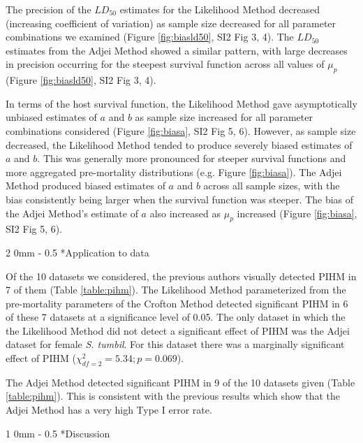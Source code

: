 \documentclass[12pt, a4paper]{article}
\makeatletter
\renewcommand{\section}{\@startsection
{section}%
{1}%
{0mm}%
{-\baselineskip}%
{0.5\baselineskip}%
{\normalfont\bf\large}} %
\renewcommand{\subsection}{\@startsection
{subsection}%
{2}%
{0mm}%
{-\baselineskip}%
{0.5\baselineskip}%
{\normalfont\bf}} %
\makeatother
\begin{document}
The precision of the $LD_{50}$ estimates for the Likelihood Method decreased
(increasing coefficient of variation) as sample size decreased for all
parameter combinations we examined (Figure \ref{fig:biasld50}, SI2 Fig 3, 4).  The $LD_{50}$ estimates from the Adjei
Method showed a similar pattern, with large decreases in precision occurring
for the steepest survival function across all values of $\mu_p$ (Figure \ref{fig:biasld50}, SI2 Fig 3, 4).

In terms of the host survival function, the Likelihood Method gave
asymptotically unbiased estimates of $a$ and $b$ as sample size increased for
all parameter combinations considered (Figure \ref{fig:biasa}, SI2 Fig 5, 6).  However, as sample size decreased, the
Likelihood Method tended to produce severely biased estimates of $a$ and $b$.
This was generally more pronounced for steeper survival functions and more
aggregated pre-mortality distributions (e.g. Figure \ref{fig:biasa}).  The Adjei Method produced
biased estimates of $a$ and $b$ across all sample sizes, with the bias
consistently being larger when the survival function was steeper. The bias of
the Adjei Method's estimate of $a$ also increased as $\mu_p$ increased (Figure \ref{fig:biasa}, SI2 Fig 5, 6).

\subsection*{Application to data}

Of the 10 datasets we considered, the previous authors visually detected PIHM
in 7 of them (Table \ref{table:pihm}).  The Likelihood Method parameterized
from the pre-mortality parameters of the Crofton Method detected significant
PIHM in 6 of these 7 datasets at a significance level of 0.05.  The only
dataset in which the the Likelihood Method did not detect a significant effect of PIHM was the Adjei dataset
for female \emph{S. tumbil}.  For this dataset there was a marginally significant effect
of PIHM ($\chi^2_{df=2} = 5.34; p = 0.069$).

The Adjei Method detected significant PIHM in 9 of the 10 datasets given (Table \ref{table:pihm}).  This is consistent with the previous results which show that the Adjei Method has a very high Type I error rate.

\section*{Discussion}
\end{document}
